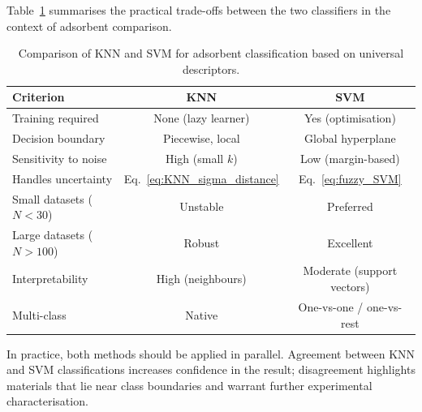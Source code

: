 \documentclass[12pt]{article}
\begin{document}
	Table~\ref{tab:KNN_vs_SVM} summarises the practical
	trade-offs between the two classifiers in the context of
	adsorbent comparison.

	\begin{table}[H]
		\centering
		\small
		\caption{Comparison of KNN and SVM for adsorbent
			classification based on universal descriptors.}
		\label{tab:KNN_vs_SVM}
		\renewcommand{\arraystretch}{1.4}
		\begin{tabular}{lcc}
			\hline
			\textbf{Criterion}
			& \textbf{KNN}
			& \textbf{SVM}
			\\
			\hline
			Training required
			& None (lazy learner)
			& Yes (optimisation)
			\\
			Decision boundary
			& Piecewise, local
			& Global hyperplane
			\\
			Sensitivity to noise
			& High (small $k$)
			& Low (margin-based)
			\\
			Handles uncertainty
			& Eq.~\eqref{eq:KNN_sigma_distance}
			& Eq.~\eqref{eq:fuzzy_SVM}
			\\
			Small datasets ($N < 30$)
			& Unstable
			& Preferred
			\\
			Large datasets ($N > 100$)
			& Robust
			& Excellent
			\\
			Interpretability
			& High (neighbours)
			& Moderate (support vectors)
			\\
			Multi-class
			& Native
			& One-vs-one / one-vs-rest
			\\
			\hline
		\end{tabular}
	\end{table}

	In practice, both methods should be applied in parallel.
	Agreement between KNN and SVM classifications increases
	confidence in the result; disagreement highlights materials
	that lie near class boundaries and warrant further
	experimental characterisation.


\end{document}
